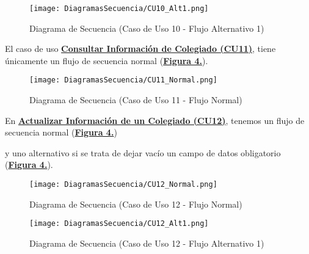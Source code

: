 \begin{landscape}
  \begin{figure}[!htbp]
    \centering
    \texttt{[image: DiagramasSecuencia/CU10\_Alt1.png]}
    \caption{Diagrama de Secuencia (Caso de Uso 10 - Flujo Alternativo 1)}
    \label{fig:Secuencia_CU10_Alt1}
  \end{figure}
\end{landscape}
\FloatBarrier

\addtocounter{figura_cap4}{1}
El caso de uso \textbf{\hyperref[tab:curConsultaInfoColeg]{Consultar Información de Colegiado (CU11)}}, tiene únicamente un flujo de secuencia normal (\textbf{\hyperref[fig:Secuencia_CU11_Normal]{Figura 4.}}).
\begin{figure}[!htbp]
  \centering
  \texttt{[image: DiagramasSecuencia/CU11\_Normal.png]}
  \caption{Diagrama de Secuencia (Caso de Uso 11 - Flujo Normal)}
  \label{fig:Secuencia_CU11_Normal}
\end{figure}
\FloatBarrier

\addtocounter{figura_cap4}{1}
En \textbf{\hyperref[tab:curActualizarColeg]{Actualizar Información de un Colegiado (CU12)}}, tenemos un flujo de secuencia normal (\textbf{\hyperref[fig:Secuencia_CU12_Normal]{Figura 4.}}) \addtocounter{figura_cap4}{1} y uno alternativo si se trata de dejar vacío un campo de datos obligatorio (\textbf{\hyperref[fig:Secuencia_CU12_Alt1]{Figura 4.}}).
\begin{landscape}
  \begin{figure}[!htbp]
    \centering
    \texttt{[image: DiagramasSecuencia/CU12\_Normal.png]}
    \caption{Diagrama de Secuencia (Caso de Uso 12 - Flujo Normal)}
    \label{fig:Secuencia_CU12_Normal}
  \end{figure}
\end{landscape}
\FloatBarrier

\begin{landscape}
  \begin{figure}[!htbp]
    \centering
    \texttt{[image: DiagramasSecuencia/CU12\_Alt1.png]}
    \caption{Diagrama de Secuencia (Caso de Uso 12 - Flujo Alternativo 1)}
    \label{fig:Secuencia_CU12_Alt1}
  \end{figure}
\end{landscape}
\FloatBarrier

